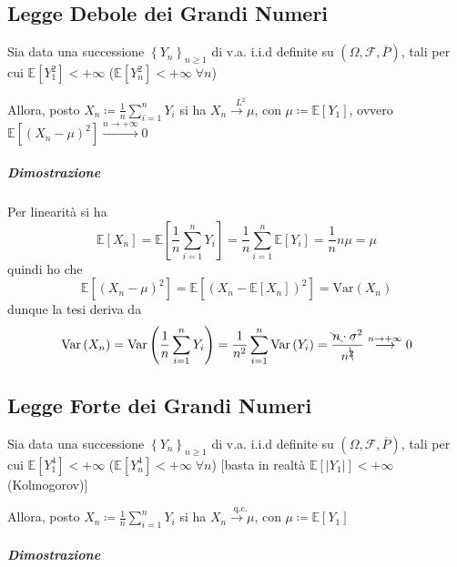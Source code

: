 \documentclass[a4paper,10pt]{article}
\theoremstyle{remark}
\theoremstyle{definition}
\begin{document}
\subsection*{Legge Debole dei Grandi Numeri}

Sia data una successione $\left\{ Y_{n}\right\} _{n\geq1}$ di v.a.
i.i.d definite su $\left(\Omega,\mathscr{F},\overline{P}\right)$,
tali per cui $\mathbb{E}\left[Y_{1}^{2}\right]<+\infty$ ($\mathbb{E}\left[Y_{n}^{2}\right]<+\infty\;\forall n$)

Allora, posto $X_{n}\coloneqq\frac{1}{n}\sum_{i=1}^{n}Y_{i}$ si ha
$X_{n}\overset{L^{2}}{\longrightarrow\mu}$, con $\mu\coloneqq\mathbb{E}\left[Y_{1}\right]$,
ovvero $\mathbb{E}\left[\left(X_{n}-\mu\right)^{2}\right]\overset{n\rightarrow+\infty}{\longrightarrow}0$

\subparagraph*{Dimostrazione}

Per linearità si ha 
\[
\mathbb{E}\left[X_{n}\right]=\mathbb{E}\left[\frac{1}{n}\sum_{i=1}^{n}Y_{i}\right]=\frac{1}{n}\sum_{i=1}^{n}\mathbb{E}\left[Y_{i}\right]=\frac{1}{n}n\mu=\mu
\]
quindi ho che 
\[
\mathbb{E}\left[\left(X_{n}-\mu\right)^{2}\right]=\mathbb{E}\left[\left(X_{n}-\mathbb{E}\left[X_{n}\right]\right)^{2}\right]=\text{Var}\left(X_{n}\right)
\]
dunque la tesi deriva da
\[
\text{Var}\left(X_{n}\right)=\text{Var}\left(\frac{1}{n}\sum_{i=1}^{n}Y_{i}\right)=\frac{1}{n^{2}}\sum_{i=1}^{n}\text{Var}\left(Y_{i}\right)=\frac{\bcancel{n}\cdot\sigma^{2}}{n^{\bcancel{2}}}\overset{n\rightarrow+\infty}{\longrightarrow}0
\]


\subsection*{Legge Forte dei Grandi Numeri}

Sia data una successione $\left\{ Y_{n}\right\} _{n\geq1}$ di v.a.
i.i.d definite su $\left(\Omega,\mathscr{F},\overline{P}\right)$,
tali per cui $\mathbb{E}\left[Y_{1}^{4}\right]<+\infty$ ($\mathbb{E}\left[Y_{n}^{4}\right]<+\infty\;\forall n$)
{[}basta in realtà $\mathbb{E}\left[\left|Y_{1}\right|\right]<+\infty$
(Kolmogorov){]}

Allora, posto $X_{n}\coloneqq\frac{1}{n}\sum_{i=1}^{n}Y_{i}$ si ha
$X_{n}\overset{\text{q.c.}}{\longrightarrow\mu}$, con $\mu\coloneqq\mathbb{E}\left[Y_{1}\right]$

\subparagraph*{Dimostrazione}
\end{document}
